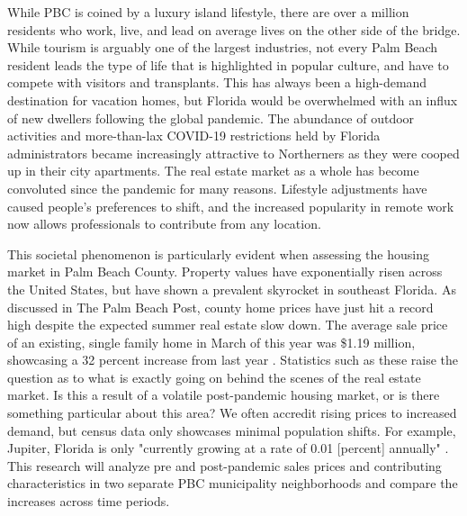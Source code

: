 \documentclass[12pt,english]{article}
\begin{document}
While PBC is coined by a luxury island lifestyle, there are over a million residents who work, live, and lead on average lives on the other side of the bridge. While tourism is arguably one of the largest industries, not every Palm Beach resident leads the type of life that is highlighted in popular culture, and have to compete with visitors and transplants. This has always been a high-demand destination for vacation homes, but Florida would be overwhelmed with an influx of new dwellers following the global pandemic. The abundance of outdoor activities and more-than-lax COVID-19 restrictions held by Florida administrators became increasingly attractive to Northerners as they were cooped up in their city apartments. The real estate market as a whole has become convoluted since the pandemic for many reasons. Lifestyle adjustments have caused people's preferences to shift, and the increased popularity in remote work now allows professionals to contribute from any location. 

This societal phenomenon is particularly evident when assessing the housing market in Palm Beach County. Property values have exponentially risen across the United States, but have shown a prevalent skyrocket in southeast Florida. As discussed in The Palm Beach Post, county home prices have just hit a record high despite the expected summer real estate slow down. The average sale price of an existing, single family home in March of this year was \$1.19 million, showcasing a 32 percent increase from last year \cite{Miller2024}. Statistics such as these raise the question as to what is exactly going on behind the scenes of the real estate market. Is this a result of a volatile post-pandemic housing market, or is there something particular about this area? We often accredit rising prices to increased demand, but census data only showcases minimal population shifts. For example, Jupiter, Florida is only "currently growing at a rate of 0.01 [percent] annually" \cite{WPR}. This research will analyze pre and post-pandemic sales prices and contributing characteristics in two separate PBC municipality neighborhoods and compare the increases across time periods. 
\end{document}
